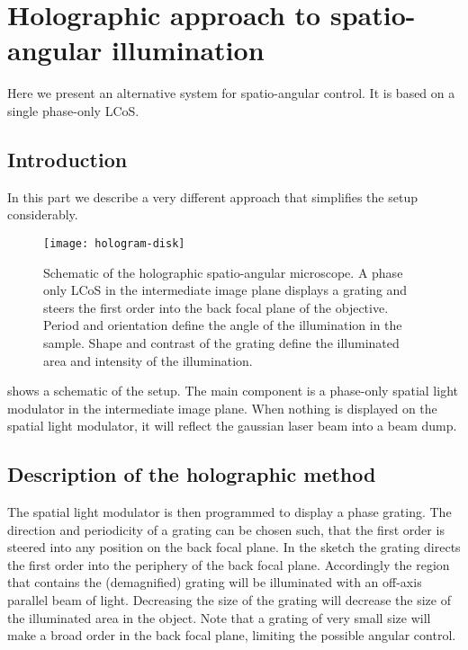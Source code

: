 \chapter{Holographic approach to spatio-angular illumination}
\begin{summary}
  Here we present an alternative system for spatio-angular control. It
  is based on a single phase-only LCoS.
\end{summary}

\section{Introduction}
In this part we describe a very different approach that simplifies the
setup considerably.

\begin{figure}[!hbt]
  \centering
  
  \texttt{[image: hologram-disk]}
  \caption{Schematic of the holographic spatio-angular microscope. A
    phase only LCoS in the intermediate image plane displays a grating
    and steers the first order into the back focal plane of the
    objective. Period and orientation define the angle of the
    illumination in the sample. Shape and contrast of the grating
    define the illuminated area and intensity of the illumination.}
  \label{fig:holo-setup3}
\end{figure}

 shows a schematic of the setup. The main
component is a phase-only spatial light modulator in the intermediate
image plane. When nothing is displayed on the spatial light modulator,
it will reflect the gaussian laser beam into a beam dump.

\section{Description of the holographic method}
The spatial light modulator is then programmed to display a phase
grating.  The direction and periodicity of a grating can be chosen
such, that the first order is steered into any position on the back
focal plane. In the sketch the grating directs the first order into
the periphery of the back focal plane. Accordingly the region that
contains the (demagnified) grating will be illuminated with an
off-axis parallel beam of light. Decreasing the size of the grating will
decrease the size of the illuminated area in the object. Note that a
grating of very small size will make a broad order in the back focal
plane, limiting the possible angular control.
